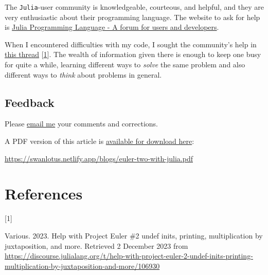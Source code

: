 \documentclass[
  a4paper,
]{article}
\newlength{\cslhangindent}
\newlength{\csllabelwidth}
\newlength{\cslentryspacingunit} %
\newenvironment{CSLReferences}[2] %
 {%
  \setlength{\parindent}{0pt}
  \ifodd #1
  \let\oldpar\par
  \def\par{\hangindent=\cslhangindent\oldpar}
  \fi
  \setlength{\parskip}{#2\cslentryspacingunit}
 }%
 {}
\newcommand{\CSLLeftMargin}[1]{\parbox[t]{\csllabelwidth}{#1}}
\newcommand{\CSLRightInline}[1]{\parbox[t]{\linewidth - \csllabelwidth}{#1}\break}
\begin{document}
The \texttt{Julia}-user community is knowledgeable, courteous, and
helpful, and they are very enthusiastic about their programming
language. The website to ask for help is
\href{https://discourse.julialang.org/}{Julia Programming Language - A
forum for users and developers}.

When I encountered difficulties with my code, I sought the community's
help in
\href{https://discourse.julialang.org/t/help-with-project-euler-2-undef-inits-printing-multiplication-by-juxtaposition-and-more/106930}{this
thread} {[}\protect\hyperlink{ref-julia-help}{1}{]}. The wealth of
information given there is enough to keep one busy for quite a while,
learning different ways to \emph{solve} the same problem and also
different ways to \emph{think} about problems in general.

\hypertarget{feedback}{%
\subsection{Feedback}\label{feedback}}

Please \href{mailto:feedback.swanlotus@gmail.com}{email me} your
comments and corrections.

\noindent A PDF version of this article is
\href{auxiliary/euler-two-with-julia.pdf}{available for download here}:

\begin{small}

\begin{sffamily}

\url{https://swanlotus.netlify.app/blogs/euler-two-with-julia.pdf}

\end{sffamily}

\end{small}

\hypertarget{bibliography}{%
\section*{References}\label{bibliography}}

\hypertarget{refs}{}
\begin{CSLReferences}{0}{0}
\leavevmode{}%
\CSLLeftMargin{{[}1{]} }%
\CSLRightInline{Various. 2023. {Help with Project Euler \#2\: undef
inits, printing, multiplication by juxtaposition, and more}. Retrieved 2
December 2023 from
\url{https://discourse.julialang.org/t/help-with-project-euler-2-undef-inits-printing-multiplication-by-juxtaposition-and-more/106930}}

\end{CSLReferences}
\end{document}
